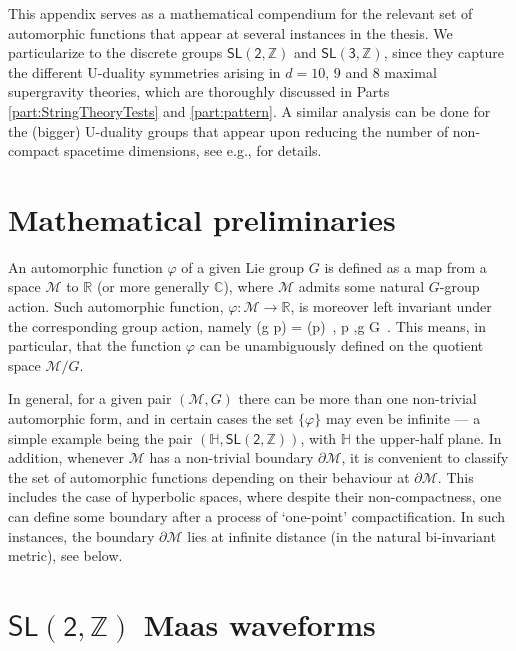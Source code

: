 This appendix serves as a mathematical compendium for the relevant set of automorphic functions that appear at several instances in the thesis. We particularize to the discrete groups $\mathsf{SL(2, \mathbb{Z})}$ and $\mathsf{SL(3, \mathbb{Z})}$, since they capture the different U-duality symmetries arising in $d=10,\, 9$ and 8 maximal supergravity theories, which are thoroughly discussed in Parts \ref{part:StringTheoryTests} and \ref{part:pattern}. A similar analysis can be done for the (bigger) U-duality groups that appear upon reducing the number of non-compact spacetime dimensions, see e.g., \cite{Green:2010kv} for details. 

\section{Mathematical preliminaries}\label{ss:mathdefs}

An automorphic function $\varphi$ of a given Lie group $G$ is defined as a map from a space $\mathcal{M}$ to $\mathbb{R}$ (or more generally $\mathbb{C}$), where $\mathcal{M}$ admits some natural $G$-group action. Such automorphic function, $\varphi: \mathcal{M} \to \mathbb{R}$, is moreover left invariant under the corresponding group action, namely
%
\beq\label{eq:automorphicfn}
 \varphi (g \cdot p) = \varphi (p)\, , \qquad \forall p \in {},\quad {}\quad \forall g \in G\, .
\eeq
%
This means, in particular, that the function $\varphi$ can be unambiguously defined on the quotient space $\mathcal{M}/G$.

In general, for a given pair $(\mathcal{M}, G)$ there can be more than one non-trivial automorphic form, and in certain cases the set $\lbrace \varphi\rbrace$ may even be infinite --- a simple example being the pair $(\mathbb{H}, \mathsf{SL(2, \mathbb{Z})})$, with $\mathbb{H}$ the upper-half plane. In addition, whenever $\mathcal{M}$ has a non-trivial boundary $\partial \mathcal{M}$, it is convenient to classify the set of automorphic functions depending on their behaviour at $\partial \mathcal{M}$. This includes the case of hyperbolic spaces, where despite their non-compactness, one can define some boundary after a process of `one-point' compactification. In such instances, the boundary $\partial \mathcal{M}$ lies at infinite distance (in the natural bi-invariant metric), see below. 

\section{$\mathsf{SL(2, \mathbb{Z})}$ Maas waveforms} \label{s:SL2Waveforms}


